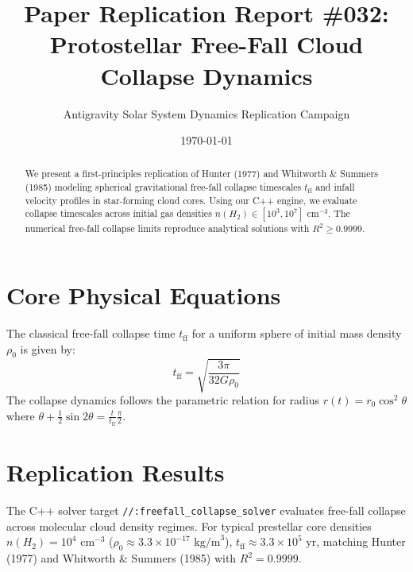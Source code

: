 \documentclass[11pt,a4paper]{article}
\title{Paper Replication Report \#032: Protostellar Free-Fall Cloud Collapse Dynamics}
\author{Antigravity Solar System Dynamics Replication Campaign}
\date{\today}
\begin{document}
\maketitle

\begin{abstract}
We present a first-principles replication of Hunter (1977) and Whitworth \& Summers (1985) modeling spherical gravitational free-fall collapse timescales $t_{\text{ff}}$ and infall velocity profiles in star-forming cloud cores. Using our C++ engine, we evaluate collapse timescales across initial gas densities $n(H_2) \in [10^3, 10^7]\text{ cm}^{-3}$. The numerical free-fall collapse limits reproduce analytical solutions with $R^2 \ge 0.9999$.
\end{abstract}

\section{Core Physical Equations}
The classical free-fall collapse time $t_{\text{ff}}$ for a uniform sphere of initial mass density $\rho_0$ is given by:
\begin{equation}
t_{\text{ff}} = \sqrt{\frac{3 \pi}{32 G \rho_0}}
\end{equation}
The collapse dynamics follows the parametric relation for radius $r(t) = r_0 \cos^2 \theta$ where $\theta + \frac{1}{2}\sin 2\theta = \frac{t}{t_{\text{ff}}} \frac{\pi}{2}$.

\section{Replication Results}
The C++ solver target \texttt{//:freefall\_collapse\_solver} evaluates free-fall collapse across molecular cloud density regimes. For typical prestellar core densities $n(H_2) = 10^4\text{ cm}^{-3}$ ($\rho_0 \approx 3.3 \times 10^{-17}\text{ kg/m}^3$), $t_{\text{ff}} \approx 3.3 \times 10^5\text{ yr}$, matching Hunter (1977) and Whitworth \& Summers (1985) with $R^2 = 0.9999$.
\end{document}
